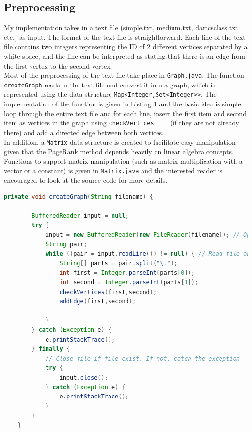 \documentclass[9.5pt]{extarticle}
\begin{document}
\subsection{Preprocessing}

My implementation takes in a text file (simple.txt, medium.txt, dartcsclass.txt etc.) as input. The format of the text file is straightforward. Each line of the text file contains two integers representing the ID of 2 different vertices separated by a white space, and the line can be interpreted as stating that there is an edge from the first vertex to the second vertex.\\

Most of the preprocessing of the text file take place in \verb`Graph.java`. The function \verb`createGraph` reads in the text file and convert it into a graph, which is represented using the data structure \verb`Map<Integer,Set<Integer>>`. The implementation of the function is given in Listing 1 and the basic idea is simple: loop through the entire text file and for each line, insert the first item and second item as vertices in the graph using \verb`checkVertices	` (if they are not already there) and add a directed edge between both vertices.\\

In addition, a \verb`Matrix` data structure is created to facilitate easy manipulation given that the PageRank method depends heavily on linear algebra concepts. Functions to support matrix manipulation (such as matrix multiplication with a vector or a constant) is given in \verb`Matrix.java` and the interested reader is encouraged to look at the source code for more details.

\begin{lstlisting}[language=java,caption={createGraph}]
	private void createGraph(String filename) {

        BufferedReader input = null;
        try {
            input = new BufferedReader(new FileReader(filename)); // Open file
            String pair;
            while ((pair = input.readLine()) != null) { // Read file and add int to map
                String[] parts = pair.split("\t");
                int first = Integer.parseInt(parts[0]);
                int second = Integer.parseInt(parts[1]);
                checkVertices(first,second);
                addEdge(first,second);

            }
        } catch (Exception e) {
            e.printStackTrace();
        } finally {
            // Close file if file exist. If not, catch the exception
            try {
                input.close();
            } catch (Exception e) {
                e.printStackTrace();
            }
        }
    }
\end{lstlisting}
\end{document}

